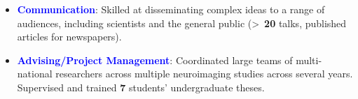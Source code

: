 \documentclass[10pt]{article}
\begin{document}

	\begin{itemize}	
		
	\item \textcolor{blue}{\textbf{Communication}}: Skilled	at	disseminating complex ideas to a range of audiences, including scientists and the general public (\textgreater ~\textbf{20} talks, published articles for newspapers).	
	
	\item \textcolor{blue}{\textbf{Advising/Project Management}}: Coordinated large teams of multi-national researchers across multiple neuroimaging studies across several years. Supervised and trained \textbf{7} students' undergraduate theses.
	
     \end{itemize}	
	
	
\end{document}
